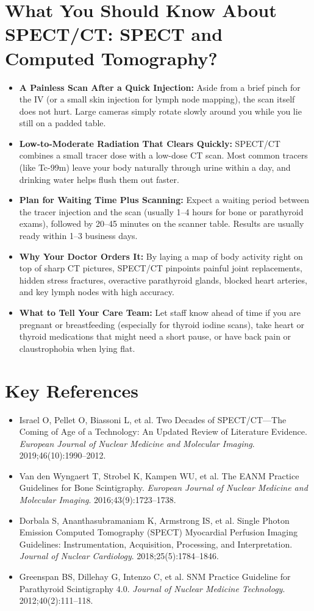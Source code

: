 \section{What You Should Know About SPECT/CT: SPECT and Computed Tomography?}
\begin{itemize}
    \item \textbf{A Painless Scan After a Quick Injection:} Aside from a brief pinch for the IV (or a small skin injection for lymph node mapping), the scan itself does not hurt. Large cameras simply rotate slowly around you while you lie still on a padded table.
    \item \textbf{Low-to-Moderate Radiation That Clears Quickly:} SPECT/CT combines a small tracer dose with a low-dose CT scan. Most common tracers (like Tc-99m) leave your body naturally through urine within a day, and drinking water helps flush them out faster.
    \item \textbf{Plan for Waiting Time Plus Scanning:} Expect a waiting period between the tracer injection and the scan (usually 1--4 hours for bone or parathyroid exams), followed by 20--45 minutes on the scanner table. Results are usually ready within 1--3 business days.
    \item \textbf{Why Your Doctor Orders It:} By laying a map of body activity right on top of sharp CT pictures, SPECT/CT pinpoints painful joint replacements, hidden stress fractures, overactive parathyroid glands, blocked heart arteries, and key lymph nodes with high accuracy.
    \item \textbf{What to Tell Your Care Team:} Let staff know ahead of time if you are pregnant or breastfeeding (especially for thyroid iodine scans), take heart or thyroid medications that might need a short pause, or have back pain or claustrophobia when lying flat.
\end{itemize}

\section{Key References}
\begin{itemize}
    \item Israel O, Pellet O, Biassoni L, et al. Two Decades of SPECT/CT---The Coming of Age of a Technology: An Updated Review of Literature Evidence. \textit{European Journal of Nuclear Medicine and Molecular Imaging}. 2019;46(10):1990--2012.
    \item Van den Wyngaert T, Strobel K, Kampen WU, et al. The EANM Practice Guidelines for Bone Scintigraphy. \textit{European Journal of Nuclear Medicine and Molecular Imaging}. 2016;43(9):1723--1738.
    \item Dorbala S, Ananthasubramaniam K, Armstrong IS, et al. Single Photon Emission Computed Tomography (SPECT) Myocardial Perfusion Imaging Guidelines: Instrumentation, Acquisition, Processing, and Interpretation. \textit{Journal of Nuclear Cardiology}. 2018;25(5):1784--1846.
    \item Greenspan BS, Dillehay G, Intenzo C, et al. SNM Practice Guideline for Parathyroid Scintigraphy 4.0. \textit{Journal of Nuclear Medicine Technology}. 2012;40(2):111--118.
\end{itemize}
